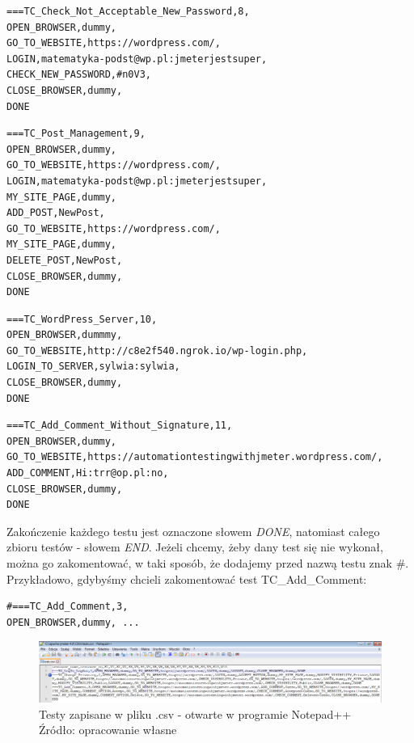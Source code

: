 \begin{lstlisting}
===TC_Check_Not_Acceptable_New_Password,8,
OPEN_BROWSER,dummy,
GO_TO_WEBSITE,https://wordpress.com/,
LOGIN,matematyka-podst@wp.pl:jmeterjestsuper,
CHECK_NEW_PASSWORD,#n0V3,
CLOSE_BROWSER,dummy,
DONE
\end{lstlisting}

\begin{lstlisting}
===TC_Post_Management,9,
OPEN_BROWSER,dummy,
GO_TO_WEBSITE,https://wordpress.com/,
LOGIN,matematyka-podst@wp.pl:jmeterjestsuper,
MY_SITE_PAGE,dummy,
ADD_POST,NewPost,
GO_TO_WEBSITE,https://wordpress.com/,
MY_SITE_PAGE,dummy,
DELETE_POST,NewPost,
CLOSE_BROWSER,dummy,
DONE
\end{lstlisting}

\begin{lstlisting}
===TC_WordPress_Server,10,
OPEN_BROWSER,dummmy,
GO_TO_WEBSITE,http://c8e2f540.ngrok.io/wp-login.php,
LOGIN_TO_SERVER,sylwia:sylwia,
CLOSE_BROWSER,dummy,
DONE
\end{lstlisting}

\begin{lstlisting}
===TC_Add_Comment_Without_Signature,11,
OPEN_BROWSER,dummy,
GO_TO_WEBSITE,https://automationtestingwithjmeter.wordpress.com/,
ADD_COMMENT,Hi:trr@op.pl:no,
CLOSE_BROWSER,dummy,
DONE
\end{lstlisting}


Zakończenie każdego testu jest oznaczone słowem \textit{DONE}, natomiast całego zbioru testów - słowem \textit{END}. Jeżeli chcemy, żeby dany test się nie wykonał, można go zakomentować, w taki sposób, że dodajemy przed nazwą testu znak \#. Przykładowo, gdybyśmy chcieli zakomentować test TC\_Add\_Comment:
\begin{lstlisting}
#===TC_Add_Comment,3,
OPEN_BROWSER,dummy, ...
\end{lstlisting}

\begin{figure}[H]
\centering
\captionsetup{justification=centering}
\includegraphics[width=1\textwidth]{NotePad.PNG}
\caption[Testy zapisane w pliku .csv - otwarte w programie Notepad++]{\label{fig:ham}Testy zapisane w pliku .csv - otwarte w programie Notepad++  \\ Źródło: opracowanie własne}
\end{figure}

